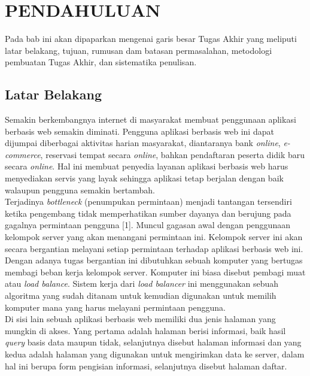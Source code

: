 \documentclass{ta-its}
\begin{document}
    \tableofcontents %
    \listoftables %
    \listoffigures %

\mainmatter %
    \chapter{PENDAHULUAN}
        Pada bab ini akan dipaparkan mengenai garis besar Tugas Akhir yang meliputi latar belakang, tujuan, rumusan dam batasan permasalahan, metodologi pembuatan Tugas Akhir, dan sistematika penulisan.

        \section{Latar Belakang}
            Semakin berkembangnya internet di masyarakat membuat penggunaan aplikasi berbasis web semakin diminati. Pengguna aplikasi berbasis web ini dapat dijumpai diberbagai aktivitas harian masyarakat, diantaranya bank \emph{online}, \emph{e-commerce}, reservasi tempat secara \emph{online}, bahkan pendaftaran peserta didik baru secara \emph{online}. Hal ini membuat penyedia layanan aplikasi berbasis web harus menyediakan servis yang layak sehingga aplikasi tetap berjalan dengan baik walaupun pengguna semakin bertambah.\\
			\indent Terjadinya \emph{bottleneck} (penumpukan permintaan) menjadi tantangan tersendiri ketika pengembang tidak memperhatikan sumber dayanya dan berujung pada gagalnya permintaan pengguna [1]. Muncul gagasan awal dengan penggunaan kelompok server yang akan menangani permintaan ini. Kelompok server ini akan secara bergantian melayani setiap permintaan terhadap aplikasi berbasis web ini. Dengan adanya tugas bergantian ini dibutuhkan sebuah komputer yang bertugas membagi beban kerja kelompok server. Komputer ini biasa disebut pembagi muat atau \emph{load balance}. Sistem kerja dari \emph{load balancer} ini menggunakan sebuah algoritma yang sudah ditanam untuk kemudian digunakan untuk memilih komputer mana yang harus melayani permintaan pengguna. \\
			\indent Di sisi lain sebuah aplikasi berbasis web memiliki dua jenis halaman yang mungkin di akses. Yang pertama adalah halaman berisi informasi, baik hasil \emph{query} basis data maupun tidak, selanjutnya disebut halaman informasi dan yang kedua adalah halaman yang digunakan untuk mengirimkan data ke server, dalam hal ini berupa form pengisian informasi, selanjutnya disebut halaman daftar. \\
\end{document}
